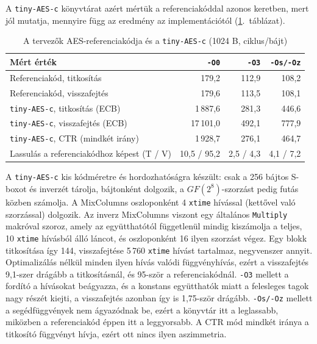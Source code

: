 \documentclass[a4paper,12pt]{report}
\theoremstyle{definition}
\theoremstyle{remark}
\begin{document}
A \texttt{tiny-AES-c} könyvtárat \cite{TinyAES} azért mértük a referenciakóddal azonos keretben, mert jól mutatja, mennyire függ az eredmény az implementációtól (\ref{tab:tiny}.~táblázat).

\begin{table}[htbp]
    \centering
    \small
    \caption{A tervezők AES-referenciakódja és a \texttt{tiny-AES-c} (1024 B, ciklus/bájt)}
    \label{tab:tiny}
    \begin{tabular}{|l|r|r|r|}
        \hline
        \textbf{Mért érték} & \textbf{\texttt{-O0}} & \textbf{\texttt{-O3}} & \textbf{\texttt{-Os/-Oz}} \\ \hline
        Referenciakód, titkosítás & 179,2 & 112,9 & 108,2 \\ \hline
        Referenciakód, visszafejtés & 179,6 & 113,5 & 108,1 \\ \hline
        \texttt{tiny-AES-c}, titkosítás (ECB) & 1\,887,6 & 281,3 & 446,6 \\ \hline
        \texttt{tiny-AES-c}, visszafejtés (ECB) & 17\,101,0 & 492,1 & 777,9 \\ \hline
        \texttt{tiny-AES-c}, CTR (mindkét irány) & 1\,928,7 & 276,1 & 464,7 \\ \hline
        Lassulás a referenciakódhoz képest (T / V) & 10,5 / 95,2 & 2,5 / 4,3 & 4,1 / 7,2 \\ \hline
    \end{tabular}
\end{table}

A \texttt{tiny-AES-c} kis kódméretre és hordozhatóságra készült: csak a 256 bájtos S-boxot és inverzét tárolja, bájtonként dolgozik, a $GF(2^8)$-szorzást pedig futás közben számolja. A MixColumns oszloponként 4 \texttt{xtime} hívással (kettővel való szorzással) dolgozik. Az inverz MixColumns viszont egy általános \texttt{Multiply} makróval szoroz, amely az együtthatótól függetlenül mindig kiszámolja a teljes, 10 \texttt{xtime} hívásból álló láncot, és oszloponként 16 ilyen szorzást végez. Egy blokk titkosítása így 144, visszafejtése 5\,760 \texttt{xtime} hívást tartalmaz, negyvenszer annyit. Optimalizálás nélkül minden ilyen hívás valódi függvényhívás, ezért a visszafejtés 9,1-szer drágább a titkosításnál, és 95-ször a referenciakódnál. \texttt{-O3} mellett a fordító a hívásokat beágyazza, és a konstans együtthatók miatt a felesleges tagok nagy részét kiejti, a visszafejtés azonban így is 1,75-ször drágább. \texttt{-Os/-Oz} mellett a segédfüggvények nem ágyazódnak be, ezért a könyvtár itt a leglassabb, miközben a referenciakód éppen itt a leggyorsabb. A CTR mód mindkét iránya a titkosító függvényt hívja, ezért ott nincs ilyen aszimmetria.
\end{document}

